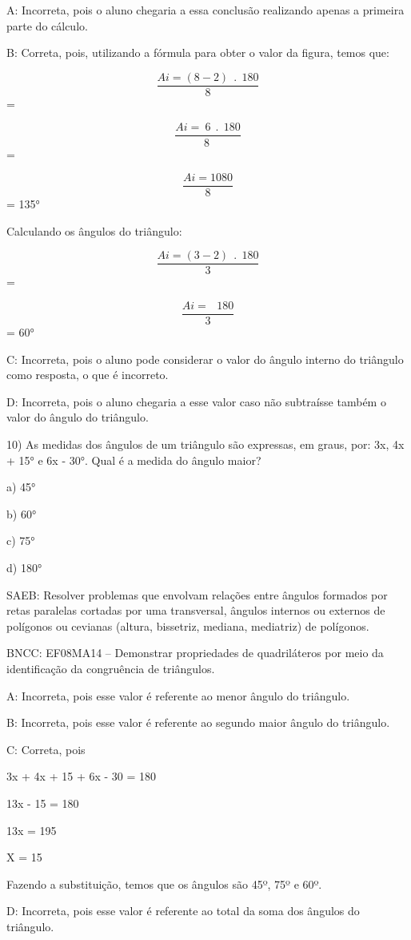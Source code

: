 A: Incorreta, pois o aluno chegaria a essa conclusão realizando apenas a
primeira parte do cálculo.

B: Correta, pois, utilizando a fórmula para obter o valor da figura,
temos que:

\[\frac{Ai = \left( 8 - 2 \right)\ \ .\ \ 180}{8}\] =

\[\frac{Ai = \ 6\ \ .\ \ 180}{8\ }\] =

\[\frac{Ai = 1080}{8}\] = 135°

Calculando os ângulos do triângulo:

\[\frac{Ai = \left( 3 - 2 \right)\ \ .\ \ 180}{3}\] =

\[\frac{Ai = \ \ \ 180}{3}\] = 60°

C: Incorreta, pois o aluno pode considerar o valor do ângulo interno do
triângulo como resposta, o que é incorreto.

D: Incorreta, pois o aluno chegaria a esse valor caso não subtraísse
também o valor do ângulo do triângulo.

10) As medidas dos ângulos de um triângulo são expressas, em graus, por:
3x, 4x + 15° e 6x - 30°. Qual é a medida do ângulo maior?

a) 45°

b) 60°

c) 75°

d) 180°

SAEB: Resolver problemas que envolvam relações entre ângulos formados
por retas paralelas cortadas por uma transversal, ângulos internos ou
externos de polígonos ou cevianas (altura, bissetriz, mediana,
mediatriz) de polígonos.

BNCC: EF08MA14 -- Demonstrar propriedades de quadriláteros por meio da
identificação da congruência de triângulos.

A: Incorreta, pois esse valor é referente ao menor ângulo do triângulo.

B: Incorreta, pois esse valor é referente ao segundo maior ângulo do
triângulo.

C: Correta, pois

3x + 4x + 15 + 6x - 30 = 180

13x - 15 = 180

13x = 195

X = 15

Fazendo a substituição, temos que os ângulos são 45º, 75º e 60º.

D: Incorreta, pois esse valor é referente ao total da soma dos ângulos
do triângulo.

